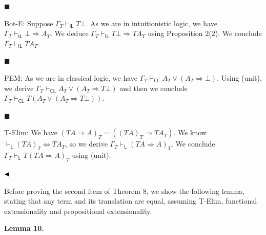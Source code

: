 \documentclass[10pt,a4paper]{article}
\begin{document}
 
 
\par\noindent  $\blacksquare$ 
 
Bot-E: Suppose $\Gamma_{T}\vdash_{\mathsf{IL}}T\bot$. As we are in intuitionistic logic, we have $\Gamma_{T}\vdash_{\mathsf{IL}}\bot\mathbin{\Rightarrow}A_{T}$. We deduce $\Gamma_{T}\vdash_{\mathsf{IL}}T\bot\mathbin{\Rightarrow}TA_{T}$ using Proposition 2(2). We conclude $\Gamma_{T}\vdash_{\mathsf{IL}}TA_{T}$.\par
 
 
 
\par\noindent  $\blacksquare$ 
 
PEM: As we are in classical logic, we have $\Gamma_{T}\vdash_{\mathsf{CL}}A_{T}\mathbin{\vee}(A_{T}\mathbin{\Rightarrow}\bot)$. Using (unit), we derive $\Gamma_{T}\vdash_{\mathsf{CL}}A_{T}\mathbin{\vee}(A_{T}\mathbin{\Rightarrow}T\bot)$ and then we conclude $\Gamma_{T}\vdash_{\mathsf{CL}}T(A_{T}\mathbin{\vee}(A_{T}\mathbin{\Rightarrow}T\bot))$.\par
 
 
 
\par\noindent  $\blacksquare$ 
 
T-Elim: We have $(TA\mathbin{\Rightarrow}A)_{T}=((TA)_{T}\mathbin{\Rightarrow}TA_{T})$. We know $\vdash_{\mathsf{L}}(TA)_{T}\Leftrightarrow TA_{T}$, so we derive $\Gamma_{T}\vdash_{\mathsf{L}}(TA\mathbin{\Rightarrow}A)_{T}$. We conclude $\Gamma_{T}\vdash_{\mathsf{L}}T(TA\mathbin{\Rightarrow}A)_{T}$ using (unit).\par
 
 
  
$\hfill\blacktriangleleft$\par
 
 
 
Before proving the second item of Theorem 8, we show the following lemma, stating that any term and its translation are equal, assuming T-Elim, functional extensionality and propositional extensionality.\par
 
 
 
\par\medskip\noindent\textbf{Lemma 10.}\par
 
\end{document}
